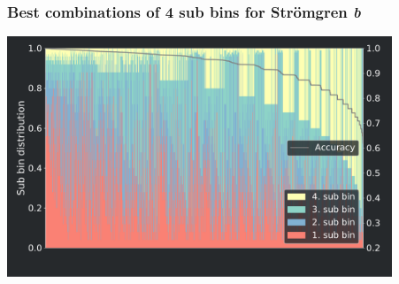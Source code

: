 \frame
{
	\frametitle{Best combinations of 4 sub bins for Str\"omgren \textit{b}}
	\centering
	\includegraphics[width=115mm]{images/optimal_stroemgren_0_c_b}
}

